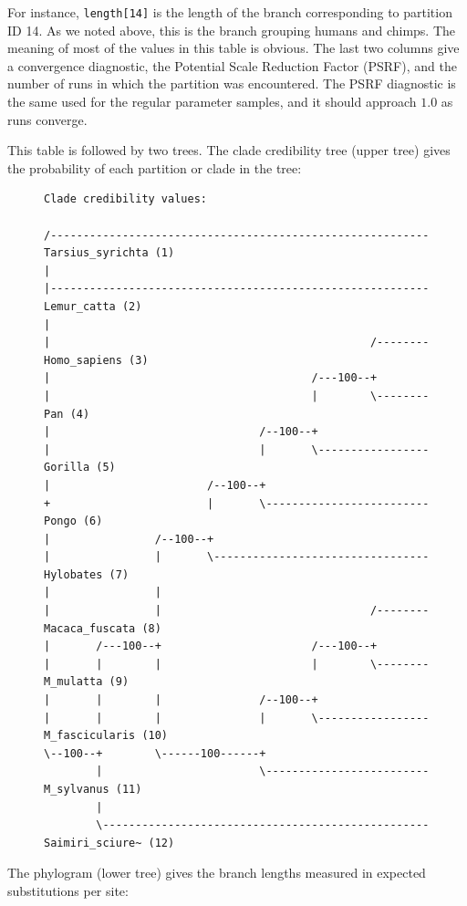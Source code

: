 \documentclass[12pt]{book}
\begin{document}
For instance, \texttt{length[14]} is the length of the branch corresponding to partition ID 14. As
we noted above, this is the branch grouping humans and chimps. The meaning of most of the values in
this table is obvious. The last two columns give a convergence diagnostic, the Potential Scale
Reduction Factor (PSRF), and the number of runs in which the partition was encountered. The PSRF
diagnostic is the same used for the regular parameter samples, and it should approach $1.0$ as runs
converge.

This table is followed by two trees. The clade credibility tree (upper tree) gives the probability
of each partition or clade in the tree:

\begin{figure}[H]
\centering
\begin{BVerbatim}[fontsize=\scriptsize]
Clade credibility values:

/---------------------------------------------------------- Tarsius_syrichta (1)
|
|---------------------------------------------------------- Lemur_catta (2)
|
|                                                 /-------- Homo_sapiens (3)
|                                        /---100--+
|                                        |        \-------- Pan (4)
|                                /--100--+
|                                |       \----------------- Gorilla (5)
|                        /--100--+
+                        |       \------------------------- Pongo (6)
|                /--100--+
|                |       \--------------------------------- Hylobates (7)
|                |
|                |                                /-------- Macaca_fuscata (8)
|       /---100--+                       /---100--+
|       |        |                       |        \-------- M_mulatta (9)
|       |        |               /--100--+
|       |        |               |       \----------------- M_fascicularis (10)
\--100--+        \------100------+
        |                        \------------------------- M_sylvanus (11)
        |
        \-------------------------------------------------- Saimiri_sciure~ (12)

\end{BVerbatim}
\end{figure}

The phylogram (lower tree) gives the branch lengths measured in expected substitutions per site:
\end{document}
